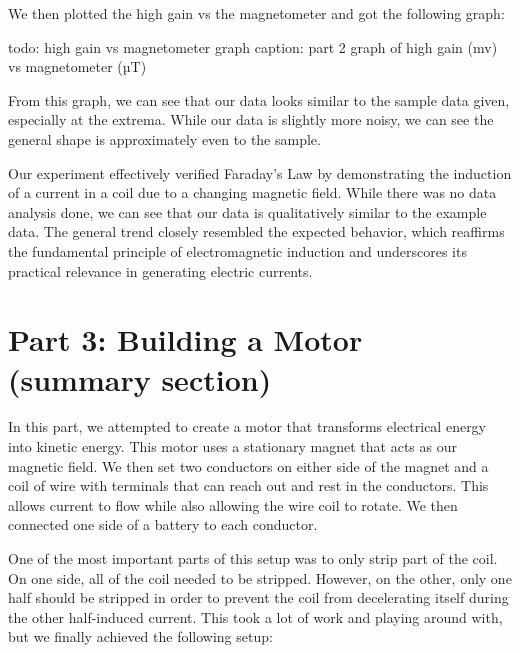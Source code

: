 \documentclass[11pt]{article}
\let\oldsection\section
\renewcommand\section{\clearpage\oldsection}
\begin{document}
    We then plotted the high gain vs the magnetometer and got the following graph:

    todo: high gain vs magnetometer graph
    caption: part 2 graph of high gain (mv) vs magnetometer (µT)

    From this graph, we can see that our data looks similar to the sample data given, especially at the extrema. While our data is slightly more noisy, we can see the general shape is approximately even to the sample.

    Our experiment effectively verified Faraday’s Law by demonstrating the induction of a current in a coil due to a changing magnetic field.  While there was no data analysis done, we can see that our data is qualitatively similar to the example data. The general trend closely resembled the expected behavior, which reaffirms the fundamental principle of electromagnetic induction and underscores its practical relevance in generating electric currents.

    \section{Part 3: Building a Motor (summary section)}\label{sec:part_3}
    In this part, we attempted to create a motor that transforms electrical energy into kinetic energy. This motor uses a stationary magnet that acts as our magnetic field. We then set two conductors on either side of the magnet and a coil of wire with terminals that can reach out and rest in the conductors. This allows current to flow while also allowing the wire coil to rotate. We then connected one side of a battery to each conductor. 

    One of the most important parts of this setup was to only strip part of the coil. On one side, all of the coil needed to be stripped. However, on the other, only one half should be stripped in order to prevent the coil from decelerating itself during the other half-induced current. This took a lot of work and playing around with, but we finally achieved the following setup:
\end{document}
